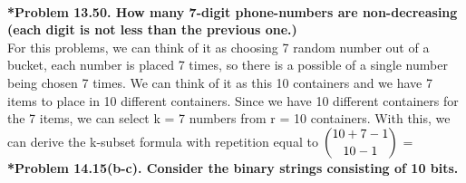 \documentclass{article}
\begin{document}
    \noindent\\[0.25in]
    \noindent \textbf{*Problem 13.50. How many 7-digit phone-numbers are non-decreasing (each digit is not less than the previous one.)}
    \\ For this problems, we can think of it as choosing 7 random number out of a bucket, each number is placed 7 times, so there is a possible of a single number being chosen
    7 times. We can think of it as this 10 containers and we have 7 items to place in 10 different containers. Since we have 10 different containers for the 7 items, we can select 
    k = 7 numbers from r = 10 containers. With this, we can derive the k-subset formula with repetition equal to $\dbinom{10 + 7 - 1}{10 - 1}$ = {\LARGE {}}
    \noindent\\[0.25in]
    \noindent \textbf{*Problem 14.15(b-c). Consider the binary strings consisting of 10 bits.}
\end{document}
